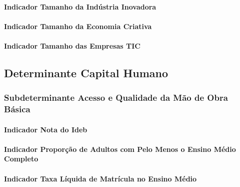 \documentclass[
  12,
  dvipsnames]{article}
\begin{document}
\hypertarget{indicador-tamanho-da-induxfastria-inovadora}{%
\paragraph{Indicador Tamanho da Indústria
Inovadora}\label{indicador-tamanho-da-induxfastria-inovadora}}

\hypertarget{indicador-tamanho-da-economia-criativa}{%
\paragraph{Indicador Tamanho da Economia
Criativa}\label{indicador-tamanho-da-economia-criativa}}

\hypertarget{indicador-tamanho-das-empresas-tic}{%
\paragraph{Indicador Tamanho das Empresas
TIC}\label{indicador-tamanho-das-empresas-tic}}

\hypertarget{det_capital_humano}{%
\subsection{Determinante Capital Humano}\label{det_capital_humano}}

\hypertarget{subdet_obra_basica}{%
\subsubsection{Subdeterminante Acesso e Qualidade da Mão de Obra
Básica}\label{subdet_obra_basica}}

\hypertarget{indicador-nota-do-ideb}{%
\paragraph{Indicador Nota do Ideb}\label{indicador-nota-do-ideb}}

\hypertarget{indicador-proporuxe7uxe3o-de-adultos-com-pelo-menos-o-ensino-muxe9dio-completo}{%
\paragraph{Indicador Proporção de Adultos com Pelo Menos o Ensino Médio
Completo}\label{indicador-proporuxe7uxe3o-de-adultos-com-pelo-menos-o-ensino-muxe9dio-completo}}

\hypertarget{indicador-taxa-luxedquida-de-matruxedcula-no-ensino-muxe9dio}{%
\paragraph{Indicador Taxa Líquida de Matrícula no Ensino
Médio}\label{indicador-taxa-luxedquida-de-matruxedcula-no-ensino-muxe9dio}}
\end{document}
